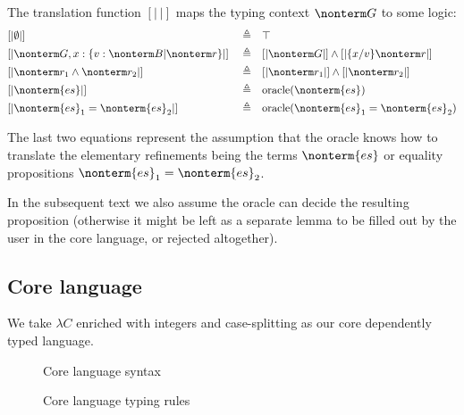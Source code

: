 \documentclass[a4paper]{article}
\begin{document}
The translation function $[|\ |]$ maps the typing context $\nonterm G$ to some logic:
\begin{equation}
\begin{aligned}
  & [| \emptyset |]                                         && \triangleq && \top																						  \\
  & [| \nonterm G, x : \{ v : \nonterm B | \nonterm r \} |] && \triangleq && [| \nonterm G |] \land [| \{x/v\} \nonterm r |]  \\
  & [| \nonterm r_1 \land \nonterm r_2 |]                   && \triangleq && [| \nonterm r_1 |] \land [| \nonterm r_2 |]      \\
  & [| \nonterm{es} |]                                      && \triangleq && \text{oracle}(\nonterm{es})                      \\
  & [| \nonterm{es}_1 = \nonterm{es}_2 |]                   && \triangleq && \text{oracle}(\nonterm{es}_1 = \nonterm{es}_2)   \\
\end{aligned}
\end{equation}

The last two equations represent the assumption
that the oracle knows how to translate the elementary refinements being the terms $\nonterm{es}$
or equality propositions $\nonterm{es}_1 = \nonterm{es}_2$.


In the subsequent text we also assume the oracle can decide the resulting proposition
(otherwise it might be left as a separate lemma to be filled out by the user in the core language, or rejected altogether).

\subsection{Core language}

We take $\lambda C$ \cite{Nederpelt14} enriched with integers and case-splitting as our core dependently typed language.

\begin{figure}[ht]
  \footnotesize
  \caption{Core language syntax}
  \label{fig:core_syntax}
\end{figure}

\begin{figure}[ht]
  \footnotesize
  \caption{Core language typing rules}
  \label{fig:core_typing}
\end{figure}
\end{document}

